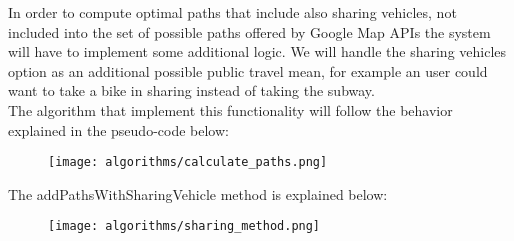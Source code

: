 In order to compute optimal paths that include also sharing vehicles, not included into the set of possible paths offered by Google Map APIs the system will have to implement some additional logic. We will handle the sharing vehicles option as an additional possible public travel mean, for example an user could want to take a bike in sharing instead of taking the subway.\\
The algorithm that implement this functionality will follow the behavior explained in the pseudo-code below:
\begin{figure}[H]
\begin{center}
		\texttt{[image: algorithms/calculate\_paths.png]}
\end{center}
\end{figure}
\noindent The addPathsWithSharingVehicle method is explained below:
\begin{figure}[H]
\begin{center}
		\texttt{[image: algorithms/sharing\_method.png]}
		
\end{center}
\end{figure}
